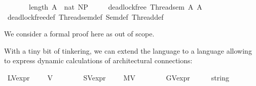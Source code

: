 \begin{isabellebody}
\ \ \ \ \ \ \ {\isacartoucheopen}length\ A\ {\isacharequal}{\kern0pt}\ nat\ NP{\isacartoucheclose}\isanewline
\ \ \ \ \ {\isacartoucheopen}deadlock{\isacharunderscore}{\kern0pt}free\ {\isacharparenleft}{\kern0pt}Thread{}{\isacharunderscore}{\kern0pt}sem\ A\ A{\isacharprime}{\kern0pt}{\isacharparenright}{\kern0pt}{\isacartoucheclose}\isanewline
%
\isadelimproof
\ \ %
\endisadelimproof
%
\isatagproof
{}\isamarkupfalse%
\ deadlock{\isacharunderscore}{\kern0pt}free{\isacharunderscore}{\kern0pt}def\ Thread{}{\isacharunderscore}{\kern0pt}sem{\isacharunderscore}{\kern0pt}def\ Sem{\isacharunderscore}{\kern0pt}def\ Thread{}{\isacharunderscore}{\kern0pt}def\isanewline
\ \ \isamarkupfalse%
%
\endisatagproof
{\isafoldproof}%
%
\isadelimproof
%
\endisadelimproof
%
\begin{isamarkuptext}%
We consider a formal proof here as out of scope.%
\end{isamarkuptext}\isamarkuptrue%
%
\isadelimdocument
%
\endisadelimdocument
%
\isatagdocument
%
\isamarkuptrue%
%
\endisatagdocument
{\isafolddocument}%
%
\isadelimdocument
%
\endisadelimdocument
%
\begin{isamarkuptext}%
With a tiny bit of tinkering, we can extend the language  to a language
allowing to express dynamic calculations of architectural connections:%
\end{isamarkuptext}\isamarkuptrue%
\isamarkupfalse%
\ {\isachardoublequoteopen}LV\isactrlsub e\isactrlsub x\isactrlsub p\isactrlsub r{\isachardoublequoteclose}\ \ {\isacharequal}{\kern0pt}\ {\isacartoucheopen}{\isasymsigma}\ {\isasymRightarrow}\ V{\isacartoucheclose}\ \ \ \ \ \ \ %
\isanewline
{}\isamarkupfalse%
\ {\isachardoublequoteopen}SV\isactrlsub e\isactrlsub x\isactrlsub p\isactrlsub r{\isachardoublequoteclose}\ \ {\isacharequal}{\kern0pt}\ {\isacartoucheopen}{\isasymsigma}\ {\isasymRightarrow}\ MV{\isacartoucheclose}\ \ \ \ \ \ %
\isanewline
{}\isamarkupfalse%
\ \ GV\isactrlsub e\isactrlsub x\isactrlsub p\isactrlsub r\ \ \ {\isacharequal}{\kern0pt}\ {\isacartoucheopen}{\isasymsigma}\ {\isasymRightarrow}\ string{\isacartoucheclose}\ \ %

\end{isabellebody}
